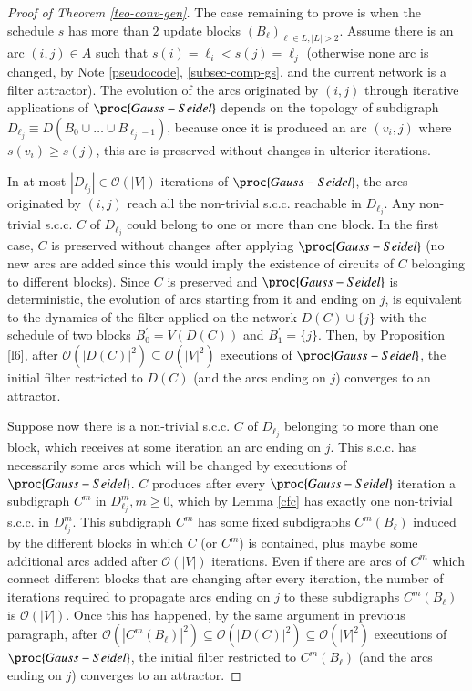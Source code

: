 \documentclass[preprint,12pt]{elsarticle}
\begin{document}
\begin{proof}[Proof of Theorem \ref{teo-conv-gen}]
The case remaining to prove is when the schedule $s$ has more than $2$ update blocks $(B_{\ell})_{\ell \in L, |L|>2}$. Assume there is an arc $(i,j) \in A$ such that $s(i)=\ell_i<s(j)=\ell_j$ (otherwise none arc is changed, by Note \ref{pseudocode}, \ref{subsec-comp-gs}, and the current network is a filter attractor). The evolution of the arcs originated by $(i,j)$ through iterative applications of $\proc{Gauss-Seidel}$ depends on the topology of subdigraph $D_{\ell_j}\equiv D(B_0\cup\ldots\cup B_{\ell_j -1})$, because once it is produced an arc $(v_i,j)$ where $s(v_i)\geq s(j)$, this arc is preserved without changes in ulterior iterations.\par
In at most $|D_{\ell_j}| \in \mathcal{O}(|V|)$ iterations of $\proc{Gauss-Seidel}$, the arcs originated by $(i,j)$ reach all the non-trivial s.c.c. reachable in $D_{\ell_j}$. Any non-trivial s.c.c. $C$ of $D_{\ell_j}$ could belong to one or more than one block. In the first case, $C$ is preserved without changes after applying $\proc{Gauss-Seidel}$ (no new arcs are added since this would imply the existence of circuits of $C$ belonging to different blocks). Since $C$ is preserved and $\proc{Gauss-Seidel}$ is deterministic, the evolution of arcs starting from it and ending on $j$, is equivalent to the dynamics of the filter applied on the network $D(C)\cup \{j\}$ with the schedule of two blocks $B_0^{\prime}=V(D(C))$ and $B_1^{\prime}=\{j\}$. Then, by Proposition \ref{l6}, after $\mathcal{O}(|D(C)|^2)\subseteq\mathcal{O}(|V|^2)$ executions of $\proc{Gauss-Seidel}$, the initial filter restricted to $D(C)$ (and the arcs ending on $j$) converges to an attractor.\par
Suppose now there is a non-trivial s.c.c. $C$ of $D_{\ell_j}$ belonging to more than one block, which receives at some iteration an arc ending on $j$. This s.c.c. has necessarily some arcs which will be changed by executions of $\proc{Gauss-Seidel}$. $C$ produces after every $\proc{Gauss-Seidel}$ iteration a subdigraph $C^m$ in $D_{\ell_j}^m, m\geq 0$, which by Lemma \ref{cfc} has exactly one non-trivial s.c.c. in $D_{\ell_j}^m$. This subdigraph $C^m$ has some fixed subdigraphs $C^m(B_{\ell})$ induced by the different blocks in which $C$ (or $C^m$) is contained, plus maybe some additional arcs added after $\mathcal{O}(|V|)$ iterations. Even if there are arcs of $C^m$ which connect different blocks that are changing after every iteration, the number of iterations required to propagate arcs ending on $j$ to these subdigraphs $C^m(B_{\ell})$ is $\mathcal{O}(|V|)$. Once this has happened, by the same argument in previous paragraph, after $\mathcal{O}(|C^m(B_{\ell})|^2)\subseteq\mathcal{O}(|D(C)|^2)\subseteq\mathcal{O}(|V|^2)$ executions of $\proc{Gauss-Seidel}$, the initial filter restricted to $C^m(B_{\ell})$ (and the arcs ending on $j$) converges to an attractor.  
\end{proof}
\end{document}
